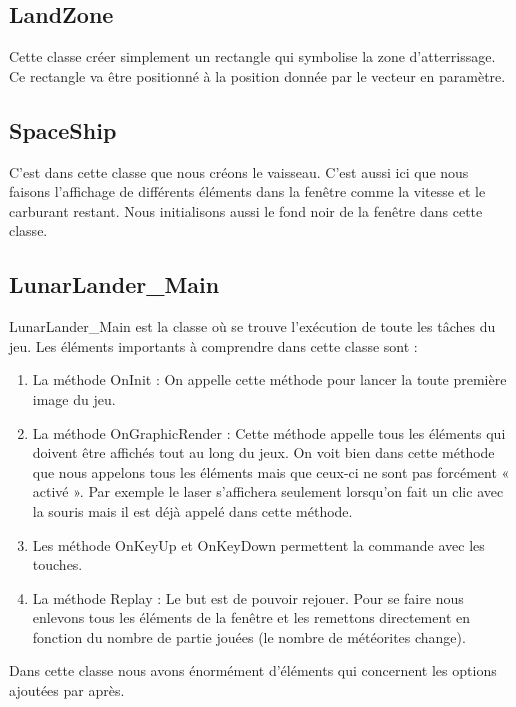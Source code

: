 \subsection{LandZone}
Cette classe créer simplement un rectangle qui symbolise la zone d’atterrissage. Ce rectangle va être positionné à la position donnée par le vecteur en paramètre.

\subsection{SpaceShip}
C’est dans cette classe que nous créons le vaisseau. C’est aussi ici que nous faisons l’affichage de différents éléments dans la fenêtre comme la vitesse et le carburant restant. Nous initialisons aussi le fond noir de la fenêtre dans cette classe.

\subsection{LunarLander\_Main}
LunarLander\_Main est la classe où se trouve l’exécution de toute les tâches du jeu. Les éléments importants à comprendre dans cette classe sont :

\begin{enumerate}
\item	La méthode OnInit : On appelle cette méthode pour lancer la toute première image du jeu.
\item	La méthode OnGraphicRender : Cette méthode appelle tous les éléments qui doivent être affichés tout au long du jeux. On voit bien dans cette méthode que nous appelons tous les éléments mais que ceux-ci ne sont pas forcément « activé ». Par exemple le laser s’affichera seulement lorsqu’on fait un clic avec la souris mais il est déjà appelé dans cette méthode.
\item	Les méthode OnKeyUp et OnKeyDown permettent la commande avec les touches.
\item La méthode Replay : Le but est de pouvoir rejouer. Pour se faire nous enlevons tous les éléments de la fenêtre et les remettons directement en fonction du nombre de partie jouées (le nombre de météorites change).
\end{enumerate}

Dans cette classe nous avons énormément d’éléments qui concernent les options ajoutées par après.
